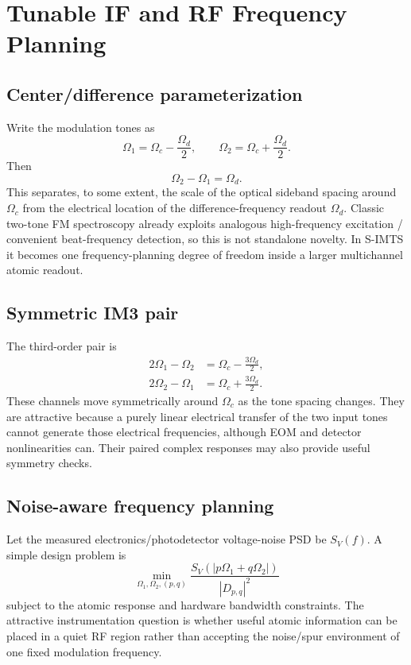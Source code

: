 \documentclass[10pt]{article}
\begin{document}
\section{Tunable IF and RF Frequency Planning}

\subsection{Center/difference parameterization}
Write the modulation tones as
\begin{equation}
\Omega_1=\Omega_c-\frac{\Omega_d}{2},\qquad
\Omega_2=\Omega_c+\frac{\Omega_d}{2}.
\end{equation}
Then
\begin{equation}
\Omega_2-\Omega_1=\Omega_d.
\end{equation}
This separates, to some extent, the scale of the optical sideband spacing around $\Omega_c$ from the electrical location of the difference-frequency readout $\Omega_d$. Classic two-tone FM spectroscopy already exploits analogous high-frequency excitation / convenient beat-frequency detection, so this is not standalone novelty. In S-IMTS it becomes one frequency-planning degree of freedom inside a larger multichannel atomic readout.

\subsection{Symmetric IM3 pair}
The third-order pair is
\begin{align}
2\Omega_1-\Omega_2&=\Omega_c-\frac{3\Omega_d}{2},\\
2\Omega_2-\Omega_1&=\Omega_c+\frac{3\Omega_d}{2}.
\end{align}
These channels move symmetrically around $\Omega_c$ as the tone spacing changes. They are attractive because a purely linear electrical transfer of the two input tones cannot generate those electrical frequencies, although EOM and detector nonlinearities can. Their paired complex responses may also provide useful symmetry checks.

\subsection{Noise-aware frequency planning}
Let the measured electronics/photodetector voltage-noise PSD be $S_V(f)$. A simple design problem is
\begin{equation}
\min_{\Omega_1,\Omega_2,(p,q)}
\frac{S_V(|p\Omega_1+q\Omega_2|)}{|D_{p,q}|^2}
\end{equation}
subject to the atomic response and hardware bandwidth constraints. The attractive instrumentation question is whether useful atomic information can be placed in a quiet RF region rather than accepting the noise/spur environment of one fixed modulation frequency.
\end{document}
